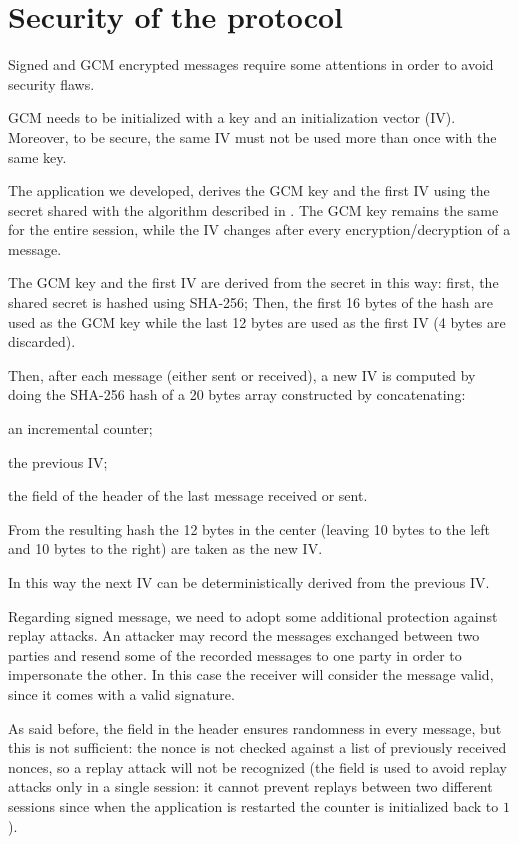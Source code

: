 \section{Security of the protocol}\label{sec:protosecurity}

Signed and GCM encrypted messages require some attentions in order to avoid
security flaws.

GCM needs to be initialized with a key and an initialization vector (IV).
Moreover, to be secure, the same IV must not be used more than once with the
same key.

The application we developed, derives the GCM key and the first IV using the
secret shared with the algorithm described in . The GCM key
remains the same for the entire session, while the IV changes after every
encryption/decryption of a message.

The GCM key and the first IV are derived from the secret in this way: first, the
shared secret is hashed using SHA-256; Then, the first 16 bytes of the hash are
used as the GCM key while the last 12 bytes are used as the first IV (4 bytes
are discarded).

Then, after each message (either sent or received), a new IV is computed by
doing the SHA-256 hash of a 20 bytes array constructed by concatenating:
\begin{enumerate*}[label=\textnormal{\arabic*)}]
	\item an incremental counter;
	\item the previous IV\@;
	\item the  field of the header of the last message received
		or sent.
\end{enumerate*}
From the resulting hash the 12 bytes in the center (leaving 10 bytes to the left
and 10 bytes to the right) are taken as the new IV\@.

In this way the next IV can be deterministically derived from the previous IV\@.

Regarding signed message, we need to adopt some additional protection against
replay attacks. An attacker may record the messages exchanged between two
parties  and resend some of the recorded
messages to one party in order to impersonate the other. In this case the
receiver will consider the message valid, since it comes with a valid signature.

As said before, the  field in the header ensures randomness in every
message, but this is not sufficient: the nonce is not checked against a list of
previously received nonces, so a replay attack will not be recognized (the
 field is used to avoid replay attacks only in a single session:
it cannot prevent replays between two different sessions since when the
application is restarted the counter is initialized back to \(1\)).

